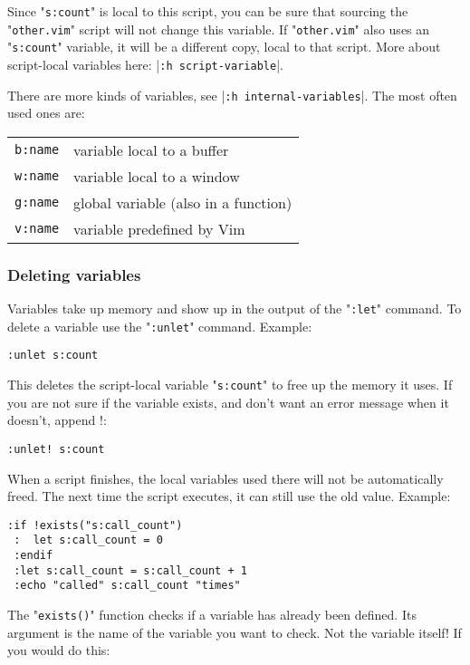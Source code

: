 Since "\verb!s:count!" is local to this script, you can be sure that sourcing the "\verb!other.vim!" script will not change this variable.
If "\verb!other.vim!" also uses an "\verb!s:count!" variable, it will be a different copy, local to that script.
More about script-local variables here: |\verb!:h script-variable!|.

There are more kinds of variables, see |\verb!:h internal-variables!|.
The most often used ones are:

\begin{center} \begin{tabular}{c l}
				\verb!b:name! & variable local to a buffer \\
				\verb!w:name! & variable local to a window \\
				\verb!g:name! & global variable (also in a function) \\
				\verb!v:name! & variable predefined by Vim \\
\end{tabular} \end{center}
\subsubsection{Deleting variables}
Variables take up memory and show up in the output of the "\verb!:let!" command.
To delete a variable use the "\verb!:unlet!" command.
Example:

\begin{Verbatim}[samepage=true]
 :unlet s:count
\end{Verbatim}

This deletes the script-local variable "\verb!s:count!" to free up the memory it uses.
If you are not sure if the variable exists, and don't want an error message when it doesn't, append !:

\begin{Verbatim}[samepage=true]
 :unlet! s:count
\end{Verbatim}

When a script finishes, the local variables used there will not be automatically freed.
The next time the script executes, it can still use the old value.
Example:

\begin{Verbatim}[samepage=true]
 :if !exists("s:call_count")
 :  let s:call_count = 0
 :endif
 :let s:call_count = s:call_count + 1
 :echo "called" s:call_count "times"
\end{Verbatim}

The "\verb!exists()!" function checks if a variable has already been defined.
Its argument is the name of the variable you want to check.
Not the variable itself!  If you would do this:


